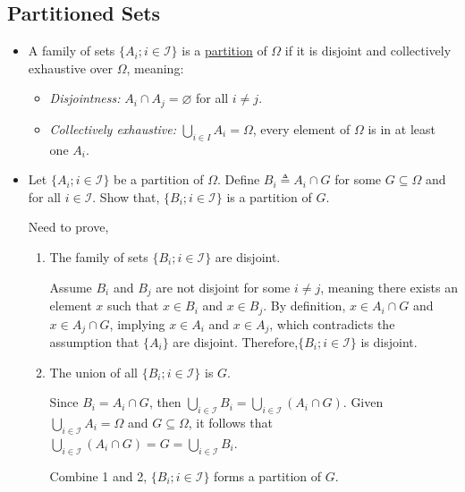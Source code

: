 \documentclass[12pt,thmsa]{article}
\let\emptyset\varnothing
\begin{document}
\subsection{Partitioned Sets} %

\begin{itemize}	
	\item A family of sets \(\{A_i; i \in \mathcal{I}\}\) is a \underline{partition} of \(\Omega\) if it is disjoint and collectively exhaustive over \(\Omega\), meaning:
	\begin{itemize}
		\item \textit{Disjointness:} \(A_i \cap A_j = \emptyset\) for all \(i \neq j\).
		\item \textit{Collectively exhaustive:} \(\bigcup_{i \in I} A_i =\Omega \), every element of \(\Omega\) is in at least one \(A_i\).
	\end{itemize}
	
	\item Let \(\{A_i; i \in \mathcal{I}\}\) be a partition of \(\Omega\). Define \(B_i \triangleq A_i \cap G\) for some \(G \subseteq \Omega\) and for all \(i \in \mathcal{I}\). Show that, \(\{B_i; i \in \mathcal{I}\}\) is a partition of \(G\).
	
	Need to prove,
	\begin{enumerate}
		\item The family of sets  \(\{B_i; i \in \mathcal{I}\}\) are disjoint.
		
		Assume \(B_i\) and \(B_j\) are not disjoint for some \(i \neq j\), meaning there exists an element \(x\) such that \(x \in B_i\) and \(x \in B_j\). By definition, \(x \in A_i \cap G\) and \(x \in A_j \cap G\), implying \(x \in A_i\) and \(x \in A_j\), which contradicts the assumption that \(\{A_i\}\) are disjoint. Therefore,\(\{B_i; i \in \mathcal{I}\}\) is disjoint.
		
		\item The union of all \(\{B_i; i \in \mathcal{I}\}\) is \(G\).
		
		Since \(B_i = A_i \cap G\), then \(\bigcup_{i \in \mathcal{I}} B_i = \bigcup_{i \in \mathcal{I}} (A_i \cap G)\). Given \(\bigcup_{i \in \mathcal{I}} A_i = \Omega\) and \(G \subseteq \Omega\), it follows that \(\bigcup_{i \in \mathcal{I}} (A_i \cap G) = G = \bigcup_{i \in \mathcal{I}} B_i\).
		
		Combine 1 and 2, \(\{B_i; i \in \mathcal{I}\}\) forms a partition of \(G\).
	\end{enumerate}

\end{itemize}
\end{document}

